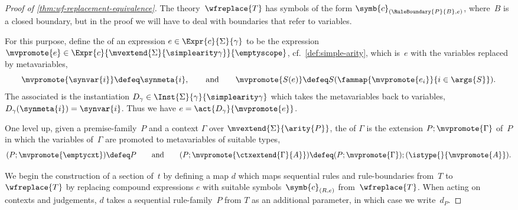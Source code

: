 \begin{proof}[Proof of \cref{thm:wf-replacement-equivalence}]

  The theory~$\wfreplace{T}$ has symbols of the form $\symb{c}_{(\RuleBoundary{P}{B},e)}$, where~$B$ is a closed boundary, but in the proof we will have to deal with boundaries that refer to variables.

  For this purpose, define the  of an expression $e \in \Expr{c}{\Sigma}{\gamma}$ to be the expression $\mvpromote{e} \in \Expr{c}{\mvextend{\Sigma}{\simplearity \gamma}}{\emptyscope}$, cf.\ \cref{def:simple-arity}, which is~$e$ with the variables replaced by metavariables,
  \begin{equation*}
    \mvpromote{\synvar{i}} \defeq \synmeta{i},
    \qquad\text{and}\qquad
    \mvpromote{S(e)} \defeq S(\fammap{\mvpromote{e_i}}{i \in \args{S}}).
  \end{equation*}
  The associated  is the instantiation $D_\gamma \in \Inst{\Sigma}{\gamma}{\simplearity \gamma}$ which takes the metavariables back to variables, $D_\gamma(\synmeta{i}) = \synvar{i}$. Thus we have $e = \act{{D_\gamma}}{\mvpromote{e}}$.

  One level up, given a premise-family~$P$ and a context $\Gamma$ over $\mvextend{\Sigma}{\arity{P}}$, the  of $\Gamma$ is the extension $P ; \mvpromote{\Gamma}$ of~$P$ in which the variables of~$\Gamma$ are promoted to metavariables of suitable types,
  \begin{equation*}
    (P ; \mvpromote{\emptycxt}) \defeq P
    \qquad\text{and}\qquad
    (P ; \mvpromote{\ctxextend{\Gamma}{A}}) \defeq
    (P ; \mvpromote{\Gamma}) ; (\istype{}{\mvpromote{A}}).
  \end{equation*}

  We begin the construction of a section of~$t$ by defining a map $d$ which maps sequential rules and rule-boundaries from~$T$ to~$\wfreplace{T}$ by replacing compound expressions $e$ with suitable symbols~$\symb{c}_{(R,e)}$ from~$\wfreplace{T}$.
  When acting on contexts and judgements, $d$ takes a sequential rule-family~$P$ from $T$ as an additional parameter, in which case we write~$d_P$.


\end{proof}
